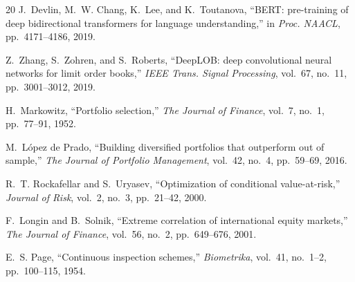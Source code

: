 \begin{thebibliography}{20}
J.~Devlin, M.~W. Chang, K.~Lee, and K.~Toutanova, ``BERT: pre-training of deep bidirectional transformers for language understanding,'' in \textit{Proc. NAACL}, pp.~4171--4186, 2019.

Z.~Zhang, S.~Zohren, and S.~Roberts, ``DeepLOB: deep convolutional neural networks for limit order books,'' \textit{IEEE Trans. Signal Processing}, vol.~67, no.~11, pp.~3001--3012, 2019.

H.~Markowitz, ``Portfolio selection,'' \textit{The Journal of Finance}, vol.~7, no.~1, pp.~77--91, 1952.

M.~L\'{o}pez de Prado, ``Building diversified portfolios that outperform out of sample,'' \textit{The Journal of Portfolio Management}, vol.~42, no.~4, pp.~59--69, 2016.

R.~T. Rockafellar and S.~Uryasev, ``Optimization of conditional value-at-risk,'' \textit{Journal of Risk}, vol.~2, no.~3, pp.~21--42, 2000.

F.~Longin and B.~Solnik, ``Extreme correlation of international equity markets,'' \textit{The Journal of Finance}, vol.~56, no.~2, pp.~649--676, 2001.

E.~S. Page, ``Continuous inspection schemes,'' \textit{Biometrika}, vol.~41, no.~1--2, pp.~100--115, 1954.

\end{thebibliography}

\balance
